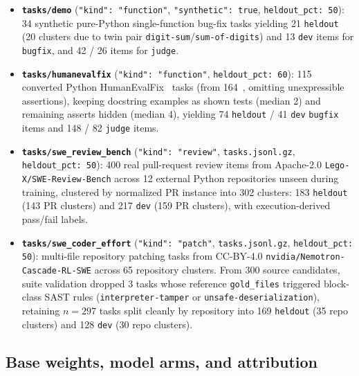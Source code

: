 \documentclass[conference]{IEEEtran}
\begin{document}
\begin{itemize}
\item \textbf{\texttt{tasks/\allowbreak{}demo}} (\texttt{"kind":\allowbreak{} "function"}, \texttt{"synthetic":\allowbreak{} true}, \texttt{heldout\_\allowbreak{}pct:\allowbreak{} 50}): 34 synthetic pure-Python single-function bug-fix tasks yielding 21 \texttt{heldout} (20 clusters due to twin pair \texttt{digit-{}sum}/\texttt{sum-{}of-{}digits}) and 13 \texttt{dev} items for \texttt{bugfix}, and 42 / 26 items for \texttt{judge}.
\item \textbf{\texttt{tasks/\allowbreak{}humanevalfix}} (\texttt{"kind":\allowbreak{} "function"}, \texttt{heldout\_\allowbreak{}pct:\allowbreak{} 60}): 115 converted Python HumanEvalFix~\cite{muennighoff2024octopack} tasks (from 164~\cite{chen2021codex}, omitting unexpressible assertions), keeping docstring examples as shown tests (median 2) and remaining asserts hidden (median 4), yielding 74 \texttt{heldout} / 41 \texttt{dev} \texttt{bugfix} items and 148 / 82 \texttt{judge} items.
\item \textbf{\texttt{tasks/\allowbreak{}swe\_\allowbreak{}review\_\allowbreak{}bench}} (\texttt{"kind":\allowbreak{} "review"}, \texttt{tasks.\allowbreak{}jsonl.\allowbreak{}gz}, \texttt{heldout\_\allowbreak{}pct:\allowbreak{} 50}): 400 real pull-request review items from Apache-2.0 \texttt{Lego-{}X/\allowbreak{}SWE-{}Review-{}Bench} across 12 external Python repositories unseen during training, clustered by normalized PR instance into 302 clusters: 183 \texttt{heldout} (143 PR clusters) and 217 \texttt{dev} (159 PR clusters), with execution-derived pass/fail labels.
\item \textbf{\texttt{tasks/\allowbreak{}swe\_\allowbreak{}coder\_\allowbreak{}effort}} (\texttt{"kind":\allowbreak{} "patch"}, \texttt{tasks.\allowbreak{}jsonl.\allowbreak{}gz}, \texttt{heldout\_\allowbreak{}pct:\allowbreak{} 50}): multi-file repository patching tasks from CC-BY-4.0 \texttt{nvidia/\allowbreak{}Nemotron-{}Cascade-{}RL-{}SWE} across 65 repository clusters. From 300 source candidates, suite validation dropped 3 tasks whose reference \texttt{gold\_\allowbreak{}files} triggered block-class SAST rules (\texttt{interpreter-{}tamper} or \texttt{unsafe-{}deserialization}), retaining $n=297$ tasks split cleanly by repository into 169 \texttt{heldout} (35 repo clusters) and 128 \texttt{dev} (30 repo clusters).
\end{itemize}

\subsection{Base weights, model arms, and attribution}
\label{sec:method-arms}
\end{document}
